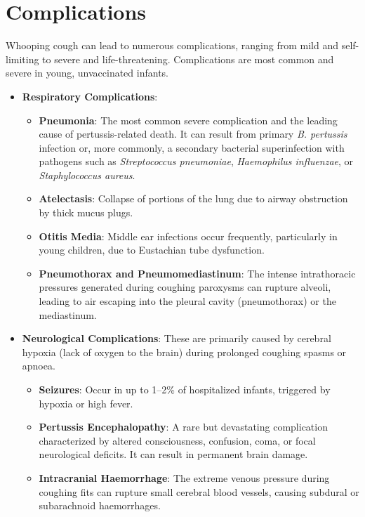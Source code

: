 \section*{Complications}
Whooping cough can lead to numerous complications, ranging from mild and self-limiting to severe and life-threatening. Complications are most common and severe in young, unvaccinated infants.
\begin{itemize}
    \item \textbf{Respiratory Complications}:
    \begin{itemize}
        \item \textbf{Pneumonia}: The most common severe complication and the leading cause of pertussis-related death. It can result from primary \textit{B. pertussis} infection or, more commonly, a secondary bacterial superinfection with pathogens such as \textit{Streptococcus pneumoniae}, \textit{Haemophilus influenzae}, or \textit{Staphylococcus aureus}.
        \item \textbf{Atelectasis}: Collapse of portions of the lung due to airway obstruction by thick mucus plugs.
        \item \textbf{Otitis Media}: Middle ear infections occur frequently, particularly in young children, due to Eustachian tube dysfunction.
        \item \textbf{Pneumothorax and Pneumomediastinum}: The intense intrathoracic pressures generated during coughing paroxysms can rupture alveoli, leading to air escaping into the pleural cavity (pneumothorax) or the mediastinum.
    \end{itemize}

    \item \textbf{Neurological Complications}: These are primarily caused by cerebral hypoxia (lack of oxygen to the brain) during prolonged coughing spasms or apnoea.
    \begin{itemize}
        \item \textbf{Seizures}: Occur in up to 1--2\% of hospitalized infants, triggered by hypoxia or high fever.
        \item \textbf{Pertussis Encephalopathy}: A rare but devastating complication characterized by altered consciousness, confusion, coma, or focal neurological deficits. It can result in permanent brain damage.
        \item \textbf{Intracranial Haemorrhage}: The extreme venous pressure during coughing fits can rupture small cerebral blood vessels, causing subdural or subarachnoid haemorrhages.
    \end{itemize}


\end{itemize}
